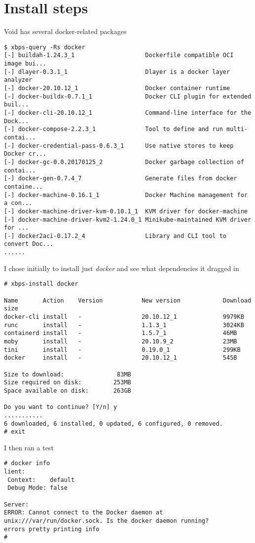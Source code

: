 \documentclass{article}  %
\begin{document}
\section{Install steps}
\label{sec:install}
Void has several docker-related packages
\begin{verbatim}
$ xbps-query -Rs docker
[-] buildah-1.24.3_1                    Dockerfile compatible OCI image bui...
[-] dlayer-0.3.1_1                      Dlayer is a docker layer analyzer
[-] docker-20.10.12_1                   Docker container runtime
[-] docker-buildx-0.7.1_1               Docker CLI plugin for extended buil...
[-] docker-cli-20.10.12_1               Command-line interface for the Dock...
[-] docker-compose-2.2.3_1              Tool to define and run multi-contai...
[-] docker-credential-pass-0.6.3_1      Use native stores to keep Docker cr...
[-] docker-gc-0.0.20170125_2            Docker garbage collection of contai...
[-] docker-gen-0.7.4_7                  Generate files from docker containe...
[-] docker-machine-0.16.1_1             Docker Machine management for a con...
[-] docker-machine-driver-kvm-0.10.1_1  KVM driver for docker-machine
[-] docker-machine-driver-kvm2-1.24.0_1 Minikube-maintained KVM driver for ...
[-] docker2aci-0.17.2_4                 Library and CLI tool to convert Doc...
......
\end{verbatim}
I chose initially to install just {\em docker} and see what dependencies it dragged in
\begin{verbatim}
# xbps-install docker

Name       Action    Version           New version            Download size
docker-cli install   -                 20.10.12_1             9979KB 
runc       install   -                 1.1.3_1                3024KB 
containerd install   -                 1.5.7_1                46MB 
moby       install   -                 20.10.9_2              23MB 
tini       install   -                 0.19.0_1               299KB 
docker     install   -                 20.10.12_1             545B 

Size to download:               83MB
Size required on disk:         253MB
Space available on disk:       263GB

Do you want to continue? [Y/n] y
...........
6 downloaded, 6 installed, 0 updated, 6 configured, 0 removed.
# exit

\end{verbatim}

I then ran a test
\begin{verbatim}
# docker info
lient:
 Context:    default
 Debug Mode: false

Server:
ERROR: Cannot connect to the Docker daemon at unix:///var/run/docker.sock. Is the docker daemon running?
errors pretty printing info
# 
\end{verbatim}
\end{document}
